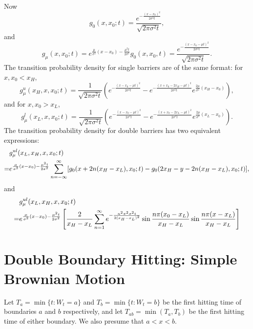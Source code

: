 Now
\begin{equation}
  g_0(x,x_0;t) 
  = \frac{e^{-\frac{(x-x_0)^2}{2\sigma^2 t}}}{\sqrt{2\pi \sigma^2 t}},
\end{equation}
and 
\begin{equation}
  g_{\mu}(x,x_0;t) 
  = e^{\frac{\mu}{\sigma^2}(x-x_0)-\frac{\mu^2 t}{2\sigma^2}} g_0(x,x_0,t)
  = \frac{e^{-\frac{(x-x_0-\mu t)^2}{2\sigma^2 t}}}{\sqrt{2\pi \sigma^2 t}}.
\end{equation}
The transition probability density for single barriers are of the same format:
for $x,x_0<x_H$,
\begin{equation}
  g^u_{\mu}(x_H,x,x_0;t)  
   = \frac{1}{\sqrt{2\pi \sigma^2 t}} 
       \left(  e^{-\frac{(x-x_0-\mu t)^2}{2\sigma^2 t}} 
             - e^{-\frac{(x+x_0-2 x_H-\mu t)^2}{2\sigma^2 t}} 
               e^{\frac{2\mu}{\sigma^2} (x_H-x_0)}
       \right),
\end{equation}
and for $x,x_0>x_L$,
\begin{equation}
  g^l_{\mu}(x_L,x,x_0;t) 
   = \frac{1}{\sqrt{2\pi \sigma^2 t}} 
       \left(  e^{-\frac{(x-x_0-\mu t)^2}{2\sigma^2 t}} 
             - e^{-\frac{(x+x_0-2 x_L-\mu t)^2}{2\sigma^2 t}} 
               e^{\frac{2\mu}{\sigma^2} (x_L-x_0)}
       \right).
\end{equation}
The transition probability density for double barriers has two equivalent
expressions:
\begin{align}
   & g^{ul}_{\mu}(x_L,x_H,x,x_0;t) \\ \notag
  =& e^{\frac{\mu}{\sigma^2}(x-x_0)-\frac{\mu^2 t}{2\sigma^2}}
     \sum_{n=-\infty}^{\infty} 
       [ g_{0}(x+2n(x_H-x_L),x_0;t) - g_{0}(2x_H-y-2n(x_H-x_L),x_0;t) ],
\end{align}
and
\begin{align}
  & g^{ul}_{\mu}(x_L,x_H,x,x_0;t) \\ \notag
 =& e^{\frac{\mu}{\sigma^2}(x-x_0)-\frac{\mu^2 t}{2\sigma^2}}
    \left[
      \frac{2}{x_H-x_L} 
      \sum_{n=1}^{\infty} e^{-\frac{n^2\pi^2 \sigma^2 t}{2(x_H-x_L)^2}}
 	 \sin \frac{n\pi (x_0-x_L)}{x_H-x_L} \sin \frac{n\pi (x-x_L)}{x_H-x_L}
    \right]
\end{align}






\section{Double Boundary Hitting: Simple Brownian Motion}
Let $T_a=\min \{t:W_t=a \}$ and $T_b=\min \{t:W_t=b \}$ be the first hitting
time of boundaries $a$ and $b$ respectively, and let $T_{ab}=\min(T_a,T_b)$ be
the first hitting time of either boundary.
We also presume that $a<x<b$.


